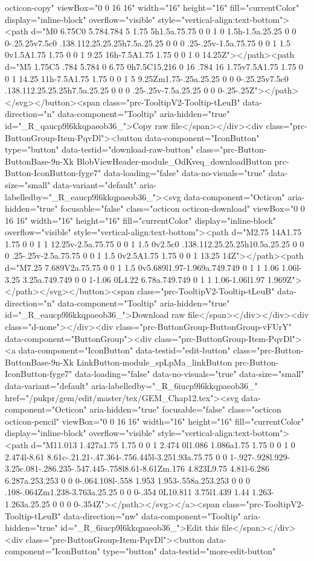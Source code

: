 octicon-copy" viewBox="0 0 16 16" width="16" height="16" fill="currentColor" display="inline-block" overflow="visible" style="vertical-align:text-bottom"><path d="M0 6.75C0 5.784.784 5 1.75 5h1.5a.75.75 0 0 1 0 1.5h-1.5a.25.25 0 0 0-.25.25v7.5c0 .138.112.25.25.25h7.5a.25.25 0 0 0 .25-.25v-1.5a.75.75 0 0 1 1.5 0v1.5A1.75 1.75 0 0 1 9.25 16h-7.5A1.75 1.75 0 0 1 0 14.25Z"></path><path d="M5 1.75C5 .784 5.784 0 6.75 0h7.5C15.216 0 16 .784 16 1.75v7.5A1.75 1.75 0 0 1 14.25 11h-7.5A1.75 1.75 0 0 1 5 9.25Zm1.75-.25a.25.25 0 0 0-.25.25v7.5c0 .138.112.25.25.25h7.5a.25.25 0 0 0 .25-.25v-7.5a.25.25 0 0 0-.25-.25Z"></path></svg></button><span class="prc-TooltipV2-Tooltip-tLeuB" data-direction="n" data-component="Tooltip" aria-hidden="true" id="_R_qaucp9l6kkqpaeob36_">Copy raw file</span></div><div class="prc-ButtonGroup-Item-PqvDl"><button data-component="IconButton" type="button" data-testid="download-raw-button" class="prc-Button-ButtonBase-9n-Xk BlobViewHeader-module_OdKveq_downloadButton prc-Button-IconButton-fyge7" data-loading="false" data-no-visuals="true" data-size="small" data-variant="default" aria-labelledby="_R_eaucp9l6kkqpaeob36_"><svg data-component="Octicon" aria-hidden="true" focusable="false" class="octicon octicon-download" viewBox="0 0 16 16" width="16" height="16" fill="currentColor" display="inline-block" overflow="visible" style="vertical-align:text-bottom"><path d="M2.75 14A1.75 1.75 0 0 1 1 12.25v-2.5a.75.75 0 0 1 1.5 0v2.5c0 .138.112.25.25.25h10.5a.25.25 0 0 0 .25-.25v-2.5a.75.75 0 0 1 1.5 0v2.5A1.75 1.75 0 0 1 13.25 14Z"></path><path d="M7.25 7.689V2a.75.75 0 0 1 1.5 0v5.689l1.97-1.969a.749.749 0 1 1 1.06 1.06l-3.25 3.25a.749.749 0 0 1-1.06 0L4.22 6.78a.749.749 0 1 1 1.06-1.06l1.97 1.969Z"></path></svg></button><span class="prc-TooltipV2-Tooltip-tLeuB" data-direction="n" data-component="Tooltip" aria-hidden="true" id="_R_eaucp9l6kkqpaeob36_">Download raw file</span></div></div><div class="d-none"></div><div class="prc-ButtonGroup-ButtonGroup-vFUrY" data-component="ButtonGroup"><div class="prc-ButtonGroup-Item-PqvDl"><a data-component="IconButton" data-testid="edit-button" class="prc-Button-ButtonBase-9n-Xk LinkButton-module_spLpMa_linkButton prc-Button-IconButton-fyge7" data-loading="false" data-no-visuals="true" data-size="small" data-variant="default" aria-labelledby="_R_6iucp9l6kkqpaeob36_" href="/pukpr/gem/edit/master/tex/GEM_Chap12.tex"><svg data-component="Octicon" aria-hidden="true" focusable="false" class="octicon octicon-pencil" viewBox="0 0 16 16" width="16" height="16" fill="currentColor" display="inline-block" overflow="visible" style="vertical-align:text-bottom"><path d="M11.013 1.427a1.75 1.75 0 0 1 2.474 0l1.086 1.086a1.75 1.75 0 0 1 0 2.474l-8.61 8.61c-.21.21-.47.364-.756.445l-3.251.93a.75.75 0 0 1-.927-.928l.929-3.25c.081-.286.235-.547.445-.758l8.61-8.61Zm.176 4.823L9.75 4.81l-6.286 6.287a.253.253 0 0 0-.064.108l-.558 1.953 1.953-.558a.253.253 0 0 0 .108-.064Zm1.238-3.763a.25.25 0 0 0-.354 0L10.811 3.75l1.439 1.44 1.263-1.263a.25.25 0 0 0 0-.354Z"></path></svg></a><span class="prc-TooltipV2-Tooltip-tLeuB" data-direction="nw" data-component="Tooltip" aria-hidden="true" id="_R_6iucp9l6kkqpaeob36_">Edit this file</span></div><div class="prc-ButtonGroup-Item-PqvDl"><button data-component="IconButton" type="button" data-testid="more-edit-button" 